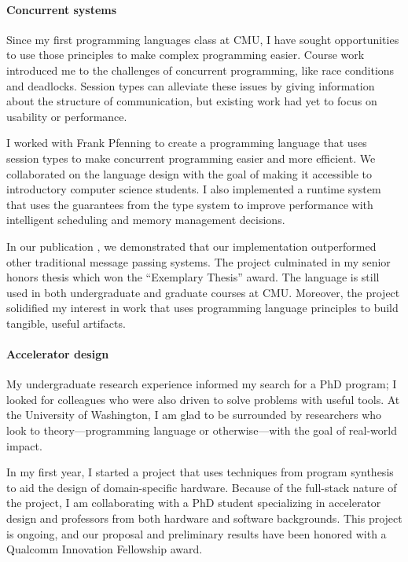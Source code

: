 \documentclass[12pt]{article}
\begin{document}
\paragraph*{Concurrent systems}
Since my first programming languages class at CMU, I have sought opportunities to use those principles to make complex programming easier.
Course work introduced me to the challenges of concurrent programming, like race conditions and deadlocks.
Session types can alleviate these issues by giving information about the structure of communication, but existing work had yet to focus on usability or performance.

I worked with Frank Pfenning to create a programming language that uses session types to make concurrent programming easier and more efficient.
We collaborated on the language design with the goal of making it accessible to introductory computer science students.
I also implemented a runtime system that uses the guarantees from the type system to improve performance with intelligent scheduling and memory management decisions.

In our publication \cite{cc0}, we demonstrated that our implementation outperformed other traditional message passing systems.
The project culminated in my senior honors thesis which won the ``Exemplary Thesis'' award. The language is still used in both undergraduate and graduate courses at CMU.
Moreover, the project solidified my interest in work that uses programming language principles to build tangible, useful artifacts.

\paragraph*{Accelerator design}
My undergraduate research experience informed my search for a PhD program; I looked for colleagues who were also driven to solve problems with useful tools.
At the University of Washington, I am glad to be surrounded by researchers who look to theory---programming language or otherwise---with the goal of real-world impact.

In my first year, I started a project that uses techniques from program synthesis to aid the design of domain-specific hardware.
Because of the full-stack nature of the project, I am collaborating with a PhD student specializing in accelerator design and professors from both hardware and software backgrounds.
This project is ongoing, and our proposal and preliminary results have been honored with a Qualcomm Innovation Fellowship award.
\end{document}
